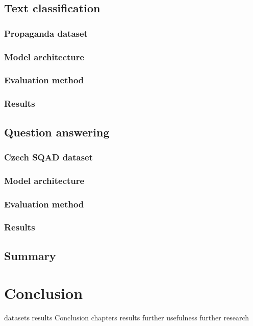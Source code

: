 \documentclass[
  digital, %
  table,   %
  twoside, %
  lof,     %
  lot,     %
]{fithesis3}
\begin{document}
\section{Text classification}
\subsection{Propaganda dataset}
\subsection{Model architecture}
\subsection{Evaluation method}
\subsection{Results}
\section{Question answering}
\subsection{Czech SQAD dataset}
\subsection{Model architecture}
\subsection{Evaluation method}
\subsection{Results}
\section{Summary}


\chapter{Conclusion}








datasets
results
Conclusion
chapters
results
further usefulness
further research
\end{document}
